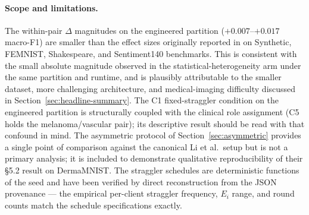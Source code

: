 \paragraph{Scope and limitations.}
The within-pair $\Delta$ magnitudes on the engineered partition
($+0.007$--$+0.017$ macro-F1) are smaller than the effect sizes
originally reported in \citet{li2020fedprox} on Synthetic, FEMNIST,
Shakespeare, and Sentiment140 benchmarks. This is consistent with
the small absolute magnitude observed in the statistical-heterogeneity
arm under the same partition and runtime, and is plausibly attributable
to the smaller dataset, more challenging architecture, and
medical-imaging difficulty discussed in
Section~\ref{sec:headline-summary}. The C1 fixed-straggler condition
on the engineered partition is structurally coupled with the clinical
role assignment (C5 holds the melanoma/vascular pair); its descriptive
result should be read with that confound in mind. The asymmetric
protocol of Section~\ref{sec:asymmetric} provides a single point of
comparison against the canonical Li et al.\ setup but is not a primary
analysis; it is included to demonstrate qualitative reproducibility of
their §5.2 result on DermaMNIST. The straggler schedules are
deterministic functions of the seed and have been verified by direct
reconstruction from the JSON provenance --- the empirical per-client
straggler frequency, $E_i$ range, and round counts match the schedule
specifications exactly.
